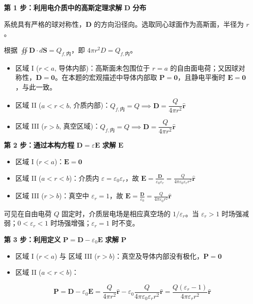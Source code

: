 \textbf{第 1 步：利用电介质中的高斯定理求解} \textbf{\(\mathbf{D}\)}
\textbf{分布}

系统具有严格的球对称性，\(\mathbf{D}\)
的方向沿径向。选取同心球面作为高斯面，半径为 \(r\)。

根据 \(\oiint \mathbf{D} \cdot d\mathbf{S} = Q_{f,\text{内}}\)，即
\(4\pi r^2D=Q_{f,\text{内}}\)。

\begin{itemize}
\tightlist
\item
  区域 I (\(r < a\), 导体内部)：高斯面未包围位于 \(r=a\)
  的自由面电荷；又因球对称性，\(\mathbf D=\mathbf0\)。在本题的宏观描述中导体内部取
  \(\mathbf P=\mathbf0\)，且静电平衡时
  \(\mathbf E=\mathbf0\)，与此一致。
\item
  区域 II (\(a < r < b\),
  介质内部)：\(Q_{f,\text{内}}=Q\implies \mathbf D=\dfrac{Q}{4\pi r^2}\hat{\mathbf r}\)
\item
  区域 III (\(r > b\),
  真空区域)：\(Q_{f,\text{内}}=Q\implies \mathbf D=\dfrac{Q}{4\pi r^2}\hat{\mathbf r}\)
\end{itemize}

\textbf{第 2 步：通过本构方程}
\textbf{\(\mathbf{D} = \varepsilon \mathbf{E}\)} \textbf{求解}
\textbf{\(\mathbf{E}\)}

\begin{itemize}
\tightlist
\item
  区域 I (\(r < a\))：\(\mathbf{E} = \mathbf{0}\)
\item
  区域 II (\(a < r < b\))：介质内
  \(\varepsilon = \varepsilon_0 \varepsilon_r\)，故
  \(\mathbf{E} = \frac{\mathbf{D}}{\varepsilon_0 \varepsilon_r} = \frac{Q}{4\pi \varepsilon_0 \varepsilon_r r^2} \hat{\mathbf{r}}\)
\item
  区域 III (\(r > b\))：真空中 \(\varepsilon_r = 1\)，故
  \(\mathbf{E} = \frac{\mathbf{D}}{\varepsilon_0} = \frac{Q}{4\pi \varepsilon_0 r^2} \hat{\mathbf{r}}\)
\end{itemize}

可见在自由电荷 \(Q\) 固定时，介质层电场是相应真空场的
\(1/\varepsilon_r\)。当 \(\varepsilon_r>1\)
时场强减弱；\(0<\varepsilon_r<1\) 时场强增强；\(\varepsilon_r=1\)
时不变。

\textbf{第 3 步：利用定义}
\textbf{\(\mathbf{P} = \mathbf{D} - \varepsilon_0 \mathbf{E}\)}
\textbf{求解} \textbf{\(\mathbf{P}\)}

\begin{itemize}
\item
  区域 I (\(r < a\)) 与 区域 III
  (\(r > b\))：真空及导体内部没有极化，\(\mathbf{P} = \mathbf{0}\)
\item
  区域 II (\(a < r < b\))：

  \[
  \mathbf{P} = \mathbf{D} - \varepsilon_0 \mathbf{E} = \frac{Q}{4\pi r^2} \hat{\mathbf{r}} - \varepsilon_0 \frac{Q}{4\pi \varepsilon_0 \varepsilon_r r^2} \hat{\mathbf{r}} = \frac{Q(\varepsilon_r - 1)}{4\pi \varepsilon_r r^2} \hat{\mathbf{r}}
  \]
\end{itemize}

